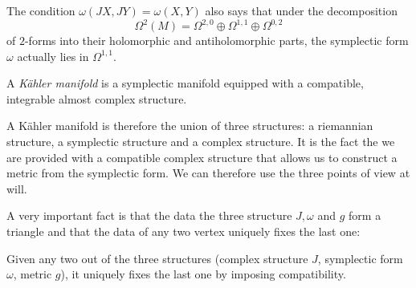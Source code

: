 \documentclass{worksheetclass}
\begin{document}
        The condition $\omega(JX,JY)=\omega(X,Y)$ also says that under the decomposition
        \begin{equation}
            \Omega^2(M) = \Omega^{2,0}\oplus\Omega^{1,1}\oplus\Omega^{0,2}
        \end{equation}
        of $2$-forms into their holomorphic and antiholomorphic parts, the symplectic form $\omega$ actually lies in $\Omega^{1,1}$.
    
        \begin{defn}
            A \emph{Kähler manifold} is a symplectic manifold equipped with a compatible, integrable almost complex structure.
        \end{defn}
        A Kähler manifold is therefore the union of three structures: a riemannian structure, a symplectic structure and a complex structure. It is the fact the we are provided with a compatible complex structure that allows us to construct a metric from the symplectic form. We can therefore use the three points of view at will. 
        
        A very important fact is that the data the three structure $J,\omega$ and $g$ form a triangle and that the data of any two vertex uniquely fixes the last one:
        \begin{prop}
            Given any two out of the three structures (complex structure $J$, symplectic form $\omega$, metric $g$), it uniquely fixes the last one by imposing compatibility.
        \end{prop}
        
\end{document}
